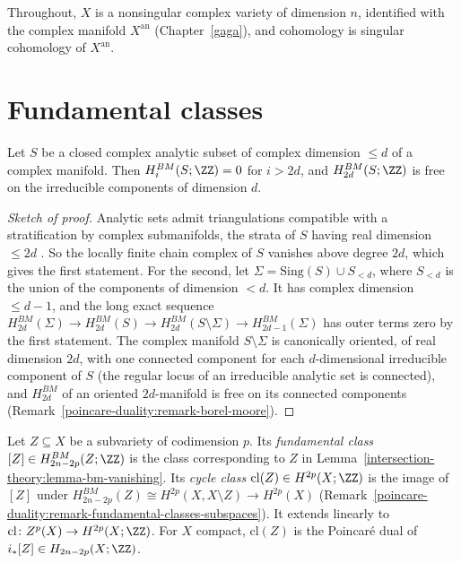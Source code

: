 Throughout, $X$ is a nonsingular complex variety of dimension $n$, identified with the complex manifold $X^{\mathrm{an}}$ (Chapter~\ref{gaga}), and cohomology is singular
cohomology of $X^{\mathrm{an}}$.

\section{Fundamental classes}\label{intersection-theory:section-fundamental-classes}

\begin{lemma}\label{intersection-theory:lemma-bm-vanishing}
Let $S$ be a closed complex analytic subset of complex dimension $\leq d$ of a complex manifold. Then $H^{BM}_i(S; \ZZ) = 0$ for $i > 2d$, and $H^{BM}_{2d}(S; \ZZ)$ is free on the
irreducible components of dimension $d$.
\end{lemma}

\begin{proof}[Sketch of proof]
Analytic sets admit triangulations compatible with a stratification by complex submanifolds, the strata of $S$ having real dimension $\leq 2d$
\cite[Chapter 19]{fulton-intersection}. So the locally finite chain complex of $S$ vanishes above degree $2d$, which gives the first statement. For the second, let
$\Sigma = \mathrm{Sing}(S) \cup S_{<d}$, where $S_{<d}$ is the union of the components of dimension $< d$. It has complex dimension $\leq d - 1$, and the long exact sequence
$H^{BM}_{2d}(\Sigma) \to H^{BM}_{2d}(S) \to H^{BM}_{2d}(S \setminus \Sigma) \to H^{BM}_{2d-1}(\Sigma)$ has outer terms zero by the first statement. The complex manifold $S \setminus \Sigma$ is
canonically oriented, of real dimension $2d$, with one connected component for each $d$-dimensional irreducible component of $S$ (the regular locus of an irreducible analytic set is
connected), and $H^{BM}_{2d}$ of an oriented $2d$-manifold is free on its connected components (Remark~\ref{poincare-duality:remark-borel-moore}).
\end{proof}

\begin{definition}\label{intersection-theory:definition-cycle-class}
Let $Z \subseteq X$ be a subvariety of codimension $p$. Its \emph{fundamental class} $[Z] \in H^{BM}_{2n-2p}(Z; \ZZ)$ is the class corresponding to $Z$ in
Lemma~\ref{intersection-theory:lemma-bm-vanishing}. Its \emph{cycle class} $\mathrm{cl}(Z) \in H^{2p}(X; \ZZ)$ is the image of $[Z]$ under
$H^{BM}_{2n-2p}(Z) \cong H^{2p}(X, X \setminus Z) \to H^{2p}(X)$ (Remark~\ref{poincare-duality:remark-fundamental-classes-subspaces}). It extends linearly to
$\mathrm{cl} \colon Z^p(X) \to H^{2p}(X; \ZZ)$. For $X$ compact, $\mathrm{cl}(Z)$ is the Poincar\'e dual of $i_*[Z] \in H_{2n-2p}(X; \ZZ)$.
\end{definition}

